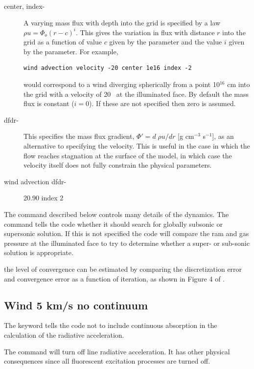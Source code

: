 \begin{shaded}
\begin{description}
\item[center, index-] A varying mass flux with depth into the grid is specified
by a law $\rho u = \Phi _o (r-c)^i $.
This gives the variation in flux
with distance $r$ into the grid as
a function of value $c$ given by the  parameter
and the value $i$ given
by the  parameter.
For example,
\begin{verbatim}
wind advection velocity -20 center 1e16 index -2
\end{verbatim}
would correspond to a wind diverging spherically
from a point 10$^{16}$ cm into
the grid with a velocity of 20 \kmps\ at the illuminated face.
By default the mass flux is constant ($i = 0$).
If these are not specified then zero is assumed.

\item[dfdr-] This specifies the mass flux gradient, $\Phi ' = d\;\rho u/dr$
[g cm$^{-3}$ s$^{-1}$],
as an alternative to specifying the velocity.
This is
useful in the case in which the flow reaches stagnation at the surface of
the model, in which case the velocity itself does not fully constrain the
physical parameters.

\item[wind advection dfdr-] 20.90 index 2
\end{description}

The  command described below
controls many details of the dynamics.
The  command tells the code
whether it should search for globally subsonic or supersonic solution.
If this is not specified the code will compare the ram and gas pressure
at the illuminated face to try to determine whether a super- or sub-sonic
solution is appropriate.

 the level of convergence can be estimated by
comparing the discretization error and convergence error as
a function of iteration, as
shown in Figure 4 of \citet{Henney2005}.
\end{shaded}

\subsection{Wind 5 km/s no continuum }

The  keyword tells the code not to include continuous
absorption in the calculation of the radiative acceleration.

The  command will turn off line
radiative acceleration.  It has other physical consequences since
all fluorescent excitation processes are turned off.

